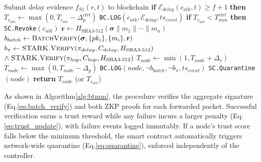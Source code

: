 \documentclass[12pt, a4paper]{report}
\begin{document}
{{\begin{algorithm}[htb]
\caption{Blockchain Trust Management and Mitigation
(\texttt{BTMM})}
\begin{algorithmic}[1]
\small
{}
    \State Submit delay evidence
           $f_{S1}(r,t)$ to blockchain
           \hfill{}
    \State \textbf{if} $\mathcal{E}_{delay}(c_{atk},t)
           \geq f{+}1$ \textbf{then}
    \State \quad $T_{c_{atk}} \gets
           \max(0,T_{c_{atk}}-\Delta_p^{ctrl})$
           \hfill{}
    \State \quad \texttt{BC.LOG}$(c_{atk},
           \mathcal{E}_{delay},ts_{event})$
    \State \textbf{if} $T_{c_{atk}}
           < T_{min}^{ctrl}$ \textbf{then}
    \State \quad \texttt{SC.Revoke}$(c_{atk})$
           \hfill{}
  \Else
    \State $\mathbf{r} \gets
           H_{\text{SHA3-512}}(
           \boldsymbol{\sigma}\|m_1\|\cdots\|m_n)$
    \State $b_{batch} \gets
           \textsc{BatchVerify}(\boldsymbol{\sigma},
           \{pk_i\},\{m_i\},\mathbf{r})$
           \hfill{}
    \State $b_{\pi} \gets
           \textsc{STARK.Verify}(\pi_{delay},
           C_{delay},H_{\text{SHA3-512}})$
           $\land\;\textsc{STARK.Verify}(\pi_{hop},
           C_{hop},H_{\text{SHA3-512}})$
      \State $T_{node} \gets
             \min(1,T_{node}+\Delta_r)$
             \hfill{}
    \Else
      \State $T_{node} \gets
             \max(0,T_{node}-\Delta_p)$
             \hfill{}
      \State \texttt{BC.LOG}$(node,
             \neg b_{batch},\neg b_{\pi},
             ts_{event})$
    \EndIf
      \State \texttt{SC.Quarantine}$(node)$
             \hfill{}
    \EndIf
  \EndIf
  \State \textbf{return} $T_{node}$ (or $T_{c_{atk}}$)
\EndProcedure
\end{algorithmic}
\label{alg:btmm}
\end{algorithm}

As shown in Algorithm\ref{alg:btmm}, the procedure verifies the
aggregate signature (Eq.\ref{eq:batch_verify}) and both ZKP proofs
for each forwarded packet. Successful verification earns a trust
reward while any failure incurs a larger penalty
(Eq.\ref{eq:trust_update}), with failure events logged immutably.
If a node's trust score falls below the minimum threshold, the
smart contract automatically triggers network-wide quarantine
(Eq.\ref{eq:quarantine}), enforced independently of the
controller.

}}
\end{document}
